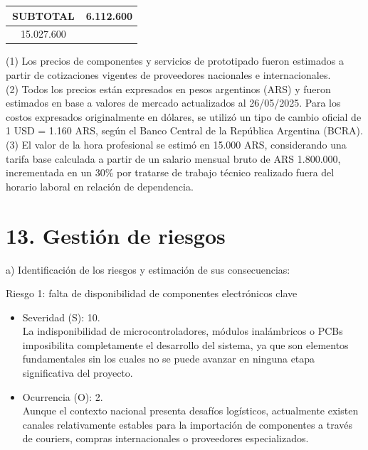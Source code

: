 \documentclass[
11pt, %
]{charter}
\begin{document}
\begin{table}[htpb]
\begin{tabularx}{\linewidth}{@{}|X|c|r|r|@{}}
\multicolumn{3}{|c|}{SUBTOTAL} &
  \multicolumn{1}{c|}{6.112.600} \\ \hline
 
\rowcolor[HTML]{C0C0C0}
\multicolumn{3}{|c|}{TOTAL} & 15.027.600
   \\ \hline
\end{tabularx}%
\end{table}

{\footnotesize(1) Los precios de componentes y servicios de prototipado fueron estimados a partir de cotizaciones vigentes de proveedores nacionales e internacionales.} \\
{\footnotesize(2) Todos los precios están expresados en pesos argentinos (ARS) y fueron estimados en base a valores de mercado actualizados al 26/05/2025. Para los costos expresados originalmente en dólares, se utilizó un tipo de cambio oficial de 1 USD = 1.160 ARS, según el Banco Central de la República Argentina (BCRA).}\\
{\footnotesize(3) El valor de la hora profesional se estimó en 15.000 ARS, considerando una tarifa base calculada a partir de un salario mensual bruto de ARS 1.800.000, incrementada en un 30\% por tratarse de trabajo técnico realizado fuera del horario laboral en relación de dependencia.}

\section{13. Gestión de riesgos}
\label{sec:riesgos}

a) Identificación de los riesgos y estimación de sus consecuencias:

Riesgo 1: falta de disponibilidad de componentes electrónicos clave
\begin{itemize}
	\item Severidad (S): 10.\\ La indisponibilidad de microcontroladores, módulos inalámbricos o PCBs imposibilita completamente el desarrollo del sistema, ya que son elementos fundamentales sin los cuales no se puede avanzar en ninguna etapa significativa del proyecto.
	\item Ocurrencia (O): 2.\\ Aunque el contexto nacional presenta desafíos logísticos, actualmente existen canales relativamente estables para la importación de componentes a través de couriers, compras internacionales o proveedores especializados.
\end{itemize}   
\end{document}
